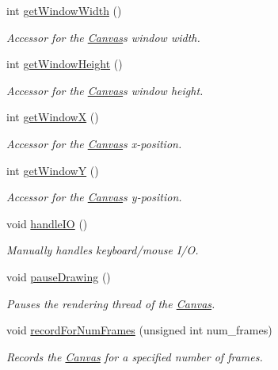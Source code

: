 \begin{DoxyCompactItemize}
int \hyperlink{classtsgl_1_1_canvas_a086a0322f4a6ab27da6929b1aa0593af}{get\+Window\+Width} ()
\begin{DoxyCompactList}\small\item\em Accessor for the \hyperlink{classtsgl_1_1_canvas}{Canvas}\textquotesingle{}s window width. \end{DoxyCompactList}\item 
int \hyperlink{classtsgl_1_1_canvas_ad740ebe5d6bd69ab79cde3e84f369f35}{get\+Window\+Height} ()
\begin{DoxyCompactList}\small\item\em Accessor for the \hyperlink{classtsgl_1_1_canvas}{Canvas}\textquotesingle{}s window height. \end{DoxyCompactList}\item 
int \hyperlink{classtsgl_1_1_canvas_a011ce2354d4565f9d2a323411a47d52d}{get\+Window\+X} ()
\begin{DoxyCompactList}\small\item\em Accessor for the \hyperlink{classtsgl_1_1_canvas}{Canvas}\textquotesingle{}s x-\/position. \end{DoxyCompactList}\item 
int \hyperlink{classtsgl_1_1_canvas_ad6e98d17d3e43d79628a3bd05221ee8b}{get\+Window\+Y} ()
\begin{DoxyCompactList}\small\item\em Accessor for the \hyperlink{classtsgl_1_1_canvas}{Canvas}\textquotesingle{}s y-\/position. \end{DoxyCompactList}\item 
void \hyperlink{classtsgl_1_1_canvas_aa499851e5e4b97bb99ca4fb3d633c17e}{handle\+I\+O} ()
\begin{DoxyCompactList}\small\item\em Manually handles keyboard/mouse I/\+O. \end{DoxyCompactList}\item 
void \hyperlink{classtsgl_1_1_canvas_abe021ab5148cc1327523689bced0f35a}{pause\+Drawing} ()
\begin{DoxyCompactList}\small\item\em Pauses the rendering thread of the \hyperlink{classtsgl_1_1_canvas}{Canvas}. \end{DoxyCompactList}\item 
void \hyperlink{classtsgl_1_1_canvas_a47436daa39473ddb4044bac7b3b27151}{record\+For\+Num\+Frames} (unsigned int num\+\_\+frames)
\begin{DoxyCompactList}\small\item\em Records the \hyperlink{classtsgl_1_1_canvas}{Canvas} for a specified number of frames. \end{DoxyCompactList}\item 

\end{DoxyCompactItemize}
